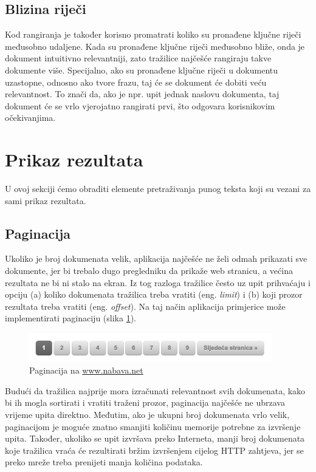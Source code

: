 \documentclass[a4paper,twoside,12pt]{scrreprt}
\begin{document}
\subsection{Blizina riječi}

Kod rangiranja je također korisno promatrati koliko su pronađene ključne riječi međusobno udaljene. Kada su pronađene ključne riječi međusobno bliže, onda je dokument intuitivno relevantniji, zato tražilice najčešće rangiraju takve dokumente više. Specijalno, ako su pronađene ključne riječi u dokumentu uzastopne, odnosno ako tvore frazu, taj će se dokument će dobiti veću relevantnost. To znači da, ako je npr. upit jednak naslovu dokumenta, taj dokument će se vrlo vjerojatno rangirati prvi, što odgovara korisnikovim očekivanjima.

\section{Prikaz rezultata}

U ovoj sekciji ćemo obraditi elemente pretraživanja punog teksta koji su vezani za sami prikaz rezultata.

\subsection{Paginacija}

Ukoliko je broj dokumenata velik, aplikacija najčešće ne želi odmah prikazati sve dokumente, jer bi trebalo dugo pregledniku da prikaže web stranicu, a većina rezultata ne bi ni stalo na ekran. Iz tog razloga tražilice često uz upit prihvaćaju i opciju (a) koliko dokumenata tražilica treba vratiti (eng. \textit{limit}) i (b) koji prozor rezultata treba vratiti (eng. \textit{offset}). Na taj način aplikacija primjerice može implementirati paginaciju (slika \ref{pagination}).

\begin{figure}[H]
  \centering
  \includegraphics[width=300pt]{pagination}
  \caption{Paginacija na \url{www.nabava.net}}
  \label{pagination}
\end{figure}

Budući da tražilica najprije mora izračunati relevantnost svih dokumenata, kako bi ih mogla sortirati i vratiti traženi prozor, paginacija najčešće ne ubrzava vrijeme upita direktno. Međutim, ako je ukupni broj dokumenata vrlo velik, paginacijom je moguće znatno smanjiti količinu memorije potrebne za izvršenje upita. Također, ukoliko se upit izvršava preko Interneta, manji broj dokumenata koje tražilica vraća će rezultirati bržim izvršenjem cijelog HTTP zahtjeva, jer se preko mreže treba prenijeti manja količina podataka.
\end{document}
